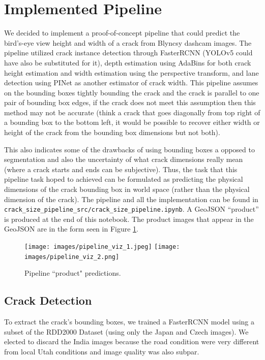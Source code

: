 \documentclass{article}
\begin{document}
\section{Implemented Pipeline}
We decided to implement a proof-of-concept pipeline that could predict the bird's-eye view height and width of a crack from Blyncsy dashcam images.
The pipeline utilized crack instance detection through FasterRCNN (YOLOv5 could have also be substituted for it), depth estimation using AdaBins for both crack height estimation and width estimation using the perspective transform, and lane detection using PINet as another estimator of crack width.
This pipeline assumes on the bounding boxes tightly bounding the crack and the crack is parallel to one pair of bounding box edges, if the crack does not meet this assumption then this method may not be accurate (think a crack that goes diagonally from top right of a bounding box to the bottom left, it would be possible to recover either width or height of the crack from the bounding box dimensions but not both).

This also indicates some of the drawbacks of using bounding boxes a opposed to segmentation and also the uncertainty of what crack dimensions really mean (where a crack starts and ends can be subjective).
Thus, the task that this pipeline task hoped to achieved can be formulated as predicting the physical dimensions of the crack bounding box in world space (rather than the physical dimension of the crack).
The pipeline and all the implementation can be found in \verb|crack_size_pipeline_src/crack_size_pipeline.ipynb|.
A GeoJSON ``product'' is produced at the end of this notebook.
The product images that appear in the GeoJSON are in the form seen in Figure \ref{fig:pipeline_viz}.

\begin{figure}[ht]
\begin{center}
\texttt{[image: images/pipeline\_viz\_1.jpeg]}
\texttt{[image: images/pipeline\_viz\_2.png]}
\end{center}
\caption{Pipeline ``product" predictions.}
\label{fig:pipeline_viz}
\end{figure}

\subsection{Crack Detection} \label{FasterRCNN-Implementation}
To extract the crack's bounding boxes, we trained a FasterRCNN model using a subset of the RDD2000 Dataset (using only the Japan and Czech images). We elected to discard the India images because the road condition were very different from local Utah conditions and image quality was also subpar. 
\end{document}

